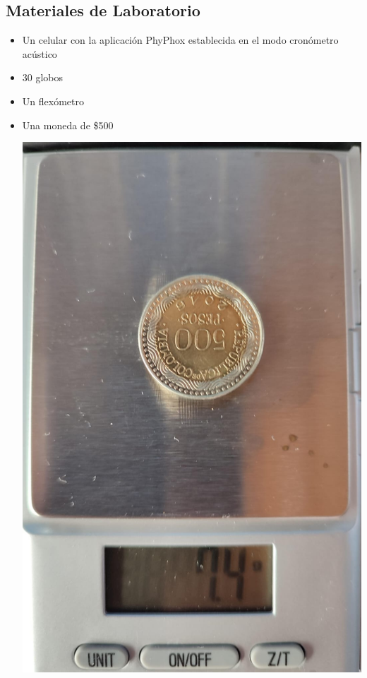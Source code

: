 \begin{multicols}{2}
\section*{Materiales de Laboratorio}  
\begin{itemize}
    \item Un celular con la aplicación PhyPhox establecida en el modo cronómetro acústico
    \item 30 globos
    \item Un flexómetro
    \item Una moneda de \$500
    \begin{center}
        \includegraphics[scale=0.05]{fig/moneda.png}
    \end{center}

\end{itemize}
\end{multicols}
